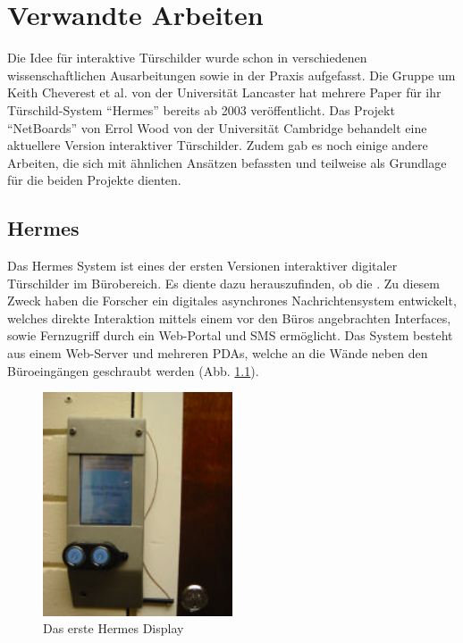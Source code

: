 \chapter{Verwandte Arbeiten}
Die Idee für interaktive Türschilder wurde schon in verschiedenen wissenschaftlichen Ausarbeitungen sowie in der Praxis aufgefasst.
Die Gruppe um Keith Cheverest et al. von der Universität Lancaster hat mehrere Paper für ihr Türschild-System ``Hermes''\cite{cheverest:2003:paper} bereits ab 2003 veröffentlicht.
Das Projekt ``NetBoards'' von Errol Wood\cite{wood:2014} von der Universität Cambridge behandelt eine aktuellere Version interaktiver Türschilder.
Zudem gab es noch einige andere Arbeiten, die sich mit ähnlichen Ansätzen befassten und teilweise als Grundlage für die beiden Projekte dienten.

\section{Hermes}
Das Hermes System\cite{cheverest:2003:paper,cheverest:2003:article,cheveres:2005:hermes-bluetooth} ist eines der ersten Versionen interaktiver digitaler Türschilder im Bürobereich.
Es diente dazu herauszufinden, ob die \cite{cheverest:2003:paper,cheverest:2003:article}.
Zu diesem Zweck haben die Forscher ein digitales asynchrones Nachrichtensystem entwickelt, welches direkte Interaktion mittels einem vor den Büros angebrachten Interfaces, sowie Fernzugriff durch ein Web-Portal und SMS ermöglicht.
Das System besteht aus einem Web-Server und mehreren PDAs, welche an die Wände neben den Büroeingängen geschraubt werden (Abb. \ref{img:hermesDisplay}).
\begin{figure}[h!]
  \centering
  \includegraphics[width=0.5\textwidth]{./img/hermes_display.png}
  \caption{Das erste Hermes Display\cite{cheverest:2003:paper}}
  \label{img:hermesDisplay}
\end{figure}
